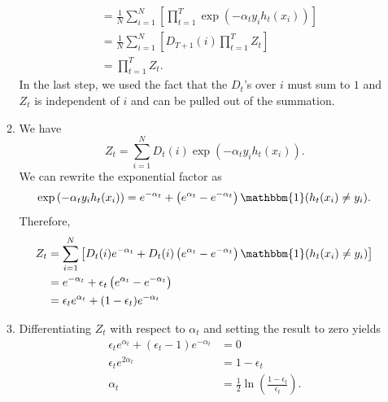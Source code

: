 \documentclass[12pt]{article}
\begin{document}
\begin{enumerate}[leftmargin=*]
\begin{enumerate}[label=\Alph*.]
\begin{align*}
&= \frac{1}{N} \sum_{i = 1}^N \left[ \prod_{t = 1}^T \exp \left( - \alpha_t y_i h_t (x_i) \right) \right] \\
&= \frac{1}{N} \sum_{i = 1}^N \left[ D_{T + 1}(i) \prod_{t = 1}^T Z_t \right] \\
&= \prod_{t = 1}^T Z_t.
\end{align*}
In the last step, we used the fact that the $D_t$'s over $i$ must sum to $1$ and $Z_t$ is independent of $i$ and can be pulled out of the summation.
\item We have
\[ Z_t = \sum_{i = 1}^N D_t(i) \exp \left( - \alpha_t y_i h_t(x_i) \right). \]
We can rewrite the exponential factor as
\[ \exp \left( - \alpha_t y_i h_t(x_i) \right) = e^{-\alpha_t} + \left( e^{\alpha_t} - e^{-\alpha_t} \right) \mathbbm{1}(h_t(x_i) \neq y_i). \]
Therefore,
\begin{align*}
Z_t &= \sum_{i = 1}^N \left[ D_t(i) e^{-\alpha_t} + D_t(i) \left( e^{\alpha_t} - e^{-\alpha_t} \right) \mathbbm{1}(h_t(x_i) \neq y_i) \right] \\
&= e^{-\alpha_t} + \epsilon_t \left(e^{\alpha_t} - e^{-\alpha_t} \right) \\
&= \epsilon_t e^{\alpha_t} + (1 - \epsilon_t) e^{-\alpha_t}
\end{align*}
\item Differentiating $Z_t$ with respect to $\alpha_t$ and setting the result to zero yields
\begin{align*}
\epsilon_t e^{\alpha_t} + (\epsilon_t - 1) e^{- \alpha_t} &= 0 \\
\epsilon_t e^{2 \alpha_t} &= 1 - \epsilon_t \\
\alpha_t &= \frac{1}{2} \ln \left( \frac{1 - \epsilon_t}{\epsilon_t} \right).
\end{align*}
\end{enumerate}
\end{enumerate}
\end{document}
